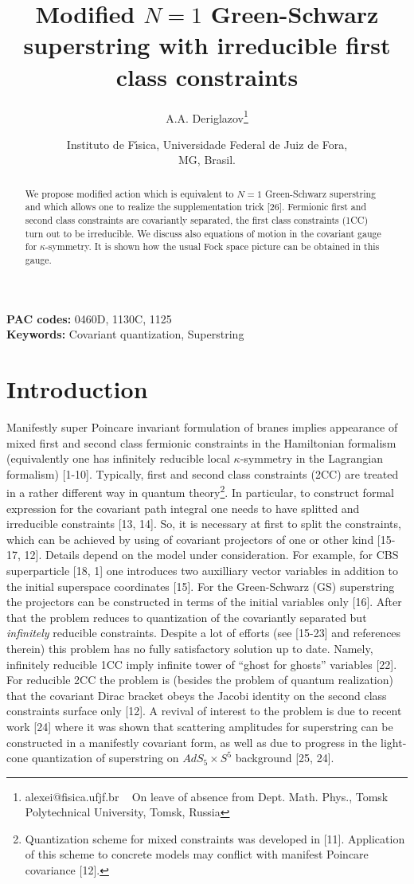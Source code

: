 \documentclass[a4paper]{article}
\title{Modified $N=1$ Green-Schwarz superstring with irreducible 
first class constraints}
\author{A.A. Deriglazov\thanks{alexei@fisica.ufjf.br ~ On leave of
absence from Dept. Math. Phys., Tomsk Polytechnical University,
Tomsk, Russia}}
\date{Instituto de F\'\i sica, Universidade Federal de Juiz de Fora,\\
MG, Brasil.}
\begin{document}
\maketitle
\large
\begin{abstract}
We propose modified action which is equivalent to $N=1$ Green-Schwarz 
superstring and which allows one to realize the supplementation trick 
[26]. Fermionic first and second class constraints are covariantly 
separated, the first class constraints (1CC) turn out to be irreducible. 
We discuss also equations of motion in the covariant gauge for 
$\kappa$-symmetry. It is shown how the usual Fock space picture can be 
obtained in this gauge.
\end{abstract}

{\bf PAC codes:} 0460D, 1130C, 1125 \\
{\bf Keywords:} Covariant quantization, Superstring \\

\noindent
\section{Introduction}
Manifestly super Poincare invariant formulation of branes implies 
appearance of mixed first and second class fermionic constraints 
in the Hamiltonian formalism (equivalently one has infinitely reducible 
local $\kappa$-symmetry in the Lagrangian formalism) [1-10]. Typically, 
first and second class constraints (2CC) are treated in a rather 
different way in quantum theory\footnote{Quantization scheme for mixed 
constraints was developed in [11]. Application of this scheme to concrete 
models may conflict with manifest Poincare covariance [12].}. In 
particular, to construct formal expression for the covariant path 
integral one needs to have splitted and irreducible constraints [13, 14]. 
So, it is necessary at first to split the constraints, 
which can be achieved 
by using of covariant projectors of one or other kind [15-17, 12]. 
Details depend on the model under consideration. For example, for 
CBS superparticle [18, 1] one introduces two auxilliary vector 
variables in addition to the initial superspace coordinates [15]. 
For the Green-Schwarz (GS) superstring the projectors can be constructed 
in terms of the initial variables only [16]. After that the problem 
reduces to quantization of the covariantly separated but 
{\em infinitely} reducible constraints. Despite a lot of efforts 
(see [15-23] and references therein) this problem has no fully 
satisfactory solution up to date. Namely, infinitely reducible 1CC 
imply infinite tower of ``ghost for ghosts'' variables [22]. For 
reducible 2CC the problem is (besides the problem of quantum 
realization) that the covariant Dirac bracket obeys the Jacobi identity 
on the second class constraints surface only [12]. A revival of interest 
to the problem is due to recent work [24] where it was shown that 
scattering amplitudes for superstring can be constructed in a manifestly 
covariant form, as well as due to progress in the light-cone 
quantization of superstring on $AdS_5\times S^5$ background [25, 24].
\end{document}

